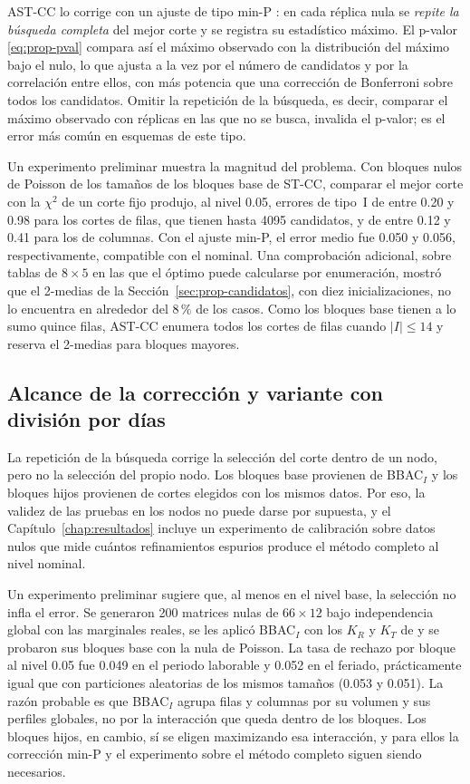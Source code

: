 AST-CC lo corrige con un ajuste de tipo min-P \cite{Westfall1993}: en cada
réplica nula se \emph{repite la búsqueda completa} del mejor corte y se
registra su estadístico máximo. El p-valor \eqref{eq:prop-pval} compara así el
máximo observado con la distribución del máximo bajo el nulo, lo que ajusta a
la vez por el número de candidatos y por la correlación entre ellos, con más
potencia que una corrección de Bonferroni sobre todos los candidatos. Omitir la
repetición de la búsqueda, es decir, comparar el máximo observado con réplicas
en las que no se busca, invalida el p-valor; es el error más común en esquemas
de este tipo.

Un experimento preliminar muestra la magnitud del problema. Con bloques nulos de
Poisson de los tamaños de los bloques base de ST-CC, comparar el mejor corte con
la $\chi^2$ de un corte fijo produjo, al nivel 0.05, errores de tipo~I de entre
0.20 y 0.98 para los cortes de filas, que tienen hasta 4095 candidatos, y de
entre 0.12 y 0.41 para los de columnas. Con el ajuste min-P, el error medio fue
0.050 y 0.056, respectivamente, compatible con el nominal. Una comprobación
adicional, sobre tablas de $8\times5$ en las que el óptimo puede calcularse por
enumeración, mostró que el 2-medias de la Sección~\ref{sec:prop-candidatos},
con diez inicializaciones, no lo encuentra en alrededor del 8\,\% de los casos. Como los bloques base tienen a lo sumo quince filas, AST-CC
enumera todos los cortes de filas cuando $|I|\le 14$ y reserva el 2-medias para
bloques mayores.

\subsection{Alcance de la corrección y variante con división por días}

La repetición de la búsqueda corrige la selección del corte dentro de un nodo,
pero no la selección del propio nodo. Los bloques base provienen de BBAC$_I$ y
los bloques hijos provienen de cortes elegidos con los mismos datos. Por eso,
la validez de las pruebas en los nodos no puede darse por supuesta, y el
Capítulo~\ref{chap:resultados} incluye un experimento de calibración sobre datos
nulos que mide cuántos refinamientos espurios produce el método completo al
nivel nominal.

Un experimento preliminar sugiere que, al menos en el nivel base, la selección
no infla el error. Se generaron 200 matrices nulas de $66\times12$ bajo
independencia global con las marginales reales, se les aplicó BBAC$_I$ con los
$K_R$ y $K_T$ de \cite{Liu2021} y se probaron sus bloques base con la nula de
Poisson. La tasa de rechazo por bloque al nivel 0.05 fue 0.049 en el periodo
laborable y 0.052 en el feriado, prácticamente igual que con particiones
aleatorias de los mismos tamaños (0.053 y 0.051). La razón probable es que
BBAC$_I$ agrupa filas y columnas por su volumen y sus perfiles globales, no por
la interacción que queda dentro de los bloques. Los bloques hijos, en cambio, sí
se eligen maximizando esa interacción, y para ellos la corrección min-P y el
experimento sobre el método completo siguen siendo necesarios.

